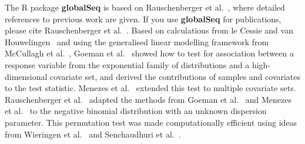 \documentclass{article}\usepackage[]{graphicx}\usepackage[]{color}
\begin{document}
The R package \textbf{globalSeq} is based on Rauschenberger et al.~\cite{Rauschenberger2016}, where detailed references to previous work are given. If you use \textbf{globalSeq} for publications, please cite Rauschenberger et al.~\cite{Rauschenberger2016}.
\newline \newline
Based on calculations from le Cessie and van Houwelingen~\cite{leCessie1995} and using the generalised linear modelling framework from McCullagh et al.~\cite{McCullagh1989}, 
Goeman et al.~\cite{Goeman2004} showed how to test for association between a response variable from the exponential family of distributions and a high-dimensional covariate set, and derived the contributions of samples and covariates to the test statistic.
Menezes et al.~\cite{Menezes2016} extended this test to multiple covariate sets.
Rauschenberger et al.~\cite{Rauschenberger2016} adapted the methods from Goeman et al.~\cite{Goeman2004} and Menezes et al.~\cite{Menezes2016} to the negative binomial distribution with an unknown dispersion parameter.
This permutation test was made computationally efficient using ideas from Wieringen et al.~\cite{Wieringen2008} and Senchaudhuri et al.~\cite{Senchaudhuri1995}.

\begingroup
\renewcommand{\section}[2]{}

\endgroup
\end{document}
